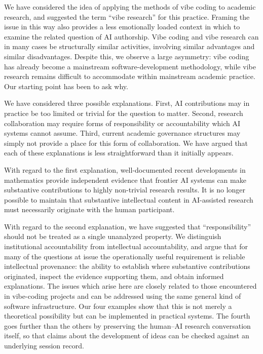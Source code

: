 \documentclass[12pt]{article}
\begin{document}
We have considered the idea of applying the methods of vibe coding to academic research, and suggested the term ``vibe research'' for this practice. Framing the issue in this way also provides a less emotionally loaded context in which to examine the related question of AI authorship. Vibe coding and vibe research can in many cases be structurally similar activities, involving similar advantages and similar disadvantages. Despite this, we observe a large asymmetry: vibe coding has already become a mainstream software-development methodology, while vibe research remains difficult to accommodate within mainstream academic practice. Our starting point has been to ask why.

We have considered three possible explanations. 
First, AI contributions may in practice be too limited or trivial for the question to matter. Second, research collaboration may require forms of responsibility or accountability which AI systems cannot assume. Third, current academic governance structures may simply not provide a place for this form of collaboration. We have argued that each of these explanations is less straightforward than it initially appears.

With regard to the first explanation, well-documented recent developments in mathematics provide independent evidence that frontier AI systems can make substantive contributions to highly non-trivial research results. 
It is no longer possible to maintain that substantive intellectual content in AI-assisted research must necessarily originate with the human participant.

With regard to the second explanation, we have suggested that ``responsibility'' should not be treated as a single unanalyzed property. We distinguish institutional accountability from intellectual accountability, and argue that for many of the questions at issue the operationally useful requirement is reliable intellectual provenance: the ability to establish where substantive contributions originated, inspect the evidence supporting them, and obtain informed explanations. The issues which arise here are closely related to those encountered in vibe-coding projects and can be addressed using the same general kind of software infrastructure. Our four examples show that this is not merely a theoretical possibility but can be implemented in practical systems. The fourth goes further than the others by preserving the human--AI research conversation itself, so that claims about the development of ideas can be checked against an underlying session record.
\end{document}
